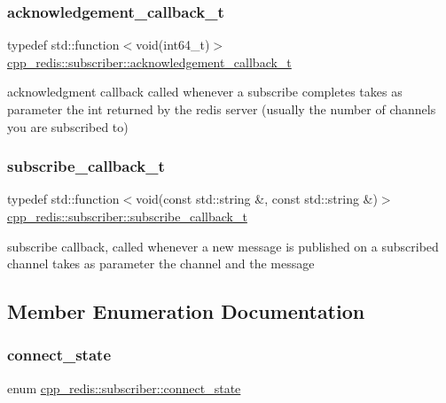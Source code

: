 \subsubsection{\texorpdfstring{acknowledgement\+\_\+callback\+\_\+t}{acknowledgement\_callback\_t}}
{\footnotesize\ttfamily typedef std\+::function$<$void(int64\+\_\+t)$>$ \mbox{\hyperlink{classcpp__redis_1_1subscriber_a19ea39dfabeb19937a9ce4c8d21781b4}{cpp\+\_\+redis\+::subscriber\+::acknowledgement\+\_\+callback\+\_\+t}}}

acknowledgment callback called whenever a subscribe completes takes as parameter the int returned by the redis server (usually the number of channels you are subscribed to) \mbox{\label{classcpp__redis_1_1subscriber_a2ac29261280f488dab483866ae875656}} 
\subsubsection{\texorpdfstring{subscribe\+\_\+callback\+\_\+t}{subscribe\_callback\_t}}
{\footnotesize\ttfamily typedef std\+::function$<$void(const std\+::string \&, const std\+::string \&)$>$ \mbox{\hyperlink{classcpp__redis_1_1subscriber_a2ac29261280f488dab483866ae875656}{cpp\+\_\+redis\+::subscriber\+::subscribe\+\_\+callback\+\_\+t}}}

subscribe callback, called whenever a new message is published on a subscribed channel takes as parameter the channel and the message 

\subsection{Member Enumeration Documentation}
\mbox{\label{classcpp__redis_1_1subscriber_afc976757efd9d0ac4def6935546a2338}} 
\subsubsection{\texorpdfstring{connect\+\_\+state}{connect\_state}}
{\footnotesize\ttfamily enum \mbox{\hyperlink{classcpp__redis_1_1subscriber_afc976757efd9d0ac4def6935546a2338}{cpp\+\_\+redis\+::subscriber\+::connect\+\_\+state}}\hspace{0.3cm}{\ttfamily [strong]}}

